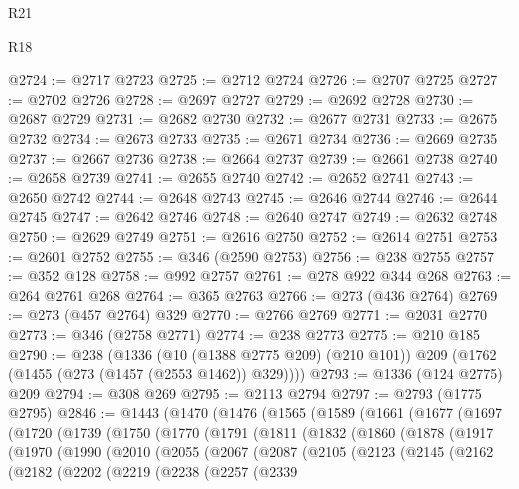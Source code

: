\begin{lexlean}{R21}
\begin{lexlean}{R18}
\begin{coremodule}
{{{{{{{{{{{{{{{{{{{{{{{{{{{{{{{{{{{{{{{{{{{{{{{{{{{{{{{{{{{{{{{{{{{{{{{{{{{{{{{{{{{{{{{{{{{{{{{{{{{{{{{{{{{{{{{{{{{{{{{{{{{{{{{{{{{{{{{{{{{{{{{@2724 := @2717 @2723
@2725 := @2712 @2724
@2726 := @2707 @2725
@2727 := @2702 @2726
@2728 := @2697 @2727
@2729 := @2692 @2728
@2730 := @2687 @2729
@2731 := @2682 @2730
@2732 := @2677 @2731
@2733 := @2675 @2732
@2734 := @2673 @2733
@2735 := @2671 @2734
@2736 := @2669 @2735
@2737 := @2667 @2736
@2738 := @2664 @2737
@2739 := @2661 @2738
@2740 := @2658 @2739
@2741 := @2655 @2740
@2742 := @2652 @2741
@2743 := @2650 @2742
@2744 := @2648 @2743
@2745 := @2646 @2744
@2746 := @2644 @2745
@2747 := @2642 @2746
@2748 := @2640 @2747
@2749 := @2632 @2748
@2750 := @2629 @2749
@2751 := @2616 @2750
@2752 := @2614 @2751
@2753 := @2601 @2752
@2755 := @346 (@2590 @2753)
@2756 := @238 @2755
@2757 := @352 @128
@2758 := @992 @2757
@2761 := @278 @922 @344 @268
@2763 := @264 @2761 @268
@2764 := @365 @2763
@2766 := @273 (@436 @2764)
@2769 := @273 (@457 @2764) @329
@2770 := @2766 @2769
@2771 := @2031 @2770
@2773 := @346 (@2758 @2771)
@2774 := @238 @2773
@2775 := @210 @185
@2790 := @238
    (@1336
      (@10 (@1388 @2775 @209) (@210 @101))
      @209
      (@1762 (@1455 (@273 (@1457 (@2553 @1462)) @329))))
@2793 := @1336 (@124 @2775) @209
@2794 := @308 @269
@2795 := @2113 @2794
@2797 := @2793 (@1775 @2795)
@2846 := @1443
    (@1470
      (@1476
        (@1565
          (@1589
            (@1661
              (@1677
                (@1697
                  (@1720
                    (@1739
                      (@1750
                        (@1770
                          (@1791
                            (@1811
                              (@1832
                                (@1860
                                  (@1878
                                    (@1917
                                      (@1970
                                        (@1990
                                          (@2010
                                            (@2055
                                              (@2067
                                                (@2087
                                                  (@2105
                                                    (@2123
                                                      (@2145
                                                        (@2162
                                                          (@2182
                                                            (@2202
                                                              (@2219
                                                                (@2238
                                                                  (@2257
                                                                    (@2339
}}}}}}}}}}}}}}}}}}}}}}}}}}}}}}}}}}}}}}}}}}}}}}}}}}}}}}}}}}}}}}}}}}}}}}}}}}}}}}}}}}}}}}}}}}}}}}}}}}}}}}}}}}}}}}}}}}}}}}}}}}}}}}}}}}}}}}}}}}}}}}}
\end{coremodule}
\end{lexlean}
\end{lexlean}
